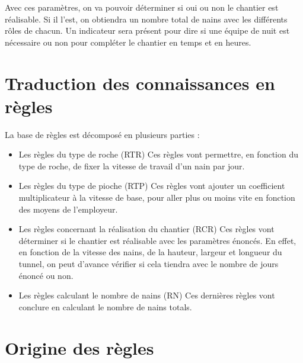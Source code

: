\documentclass[a4paper,10pt]{report}
\begin{document}
Avec ces paramètres, on va pouvoir déterminer si oui ou non le chantier est réalisable. Si il l’est, on obtiendra un nombre total de nains avec les différents rôles de chacun. Un indicateur sera présent pour dire si une équipe de nuit est nécessaire ou non pour compléter le chantier en temps et en heures.

\section{Traduction des connaissances en règles}

La base de règles est décomposé en plusieurs parties :
\begin{itemize}
\item Les règles du type de roche (RTR)
Ces règles vont permettre, en fonction du type de roche, de fixer la vitesse de travail d’un nain par jour.

\item Les règles du type de pioche (RTP)
Ces règles vont ajouter un coefficient multiplicateur à la vitesse de base, pour aller plus ou moins vite en fonction des moyens de l’employeur.

\item Les règles concernant la réalisation du chantier (RCR)
Ces règles vont déterminer si le chantier est réalisable avec les paramètres énoncés. En effet, en fonction de la vitesse des nains, de la hauteur, largeur et longueur du tunnel, on peut d’avance vérifier si cela tiendra avec le nombre de jours énoncé ou non.

\item Les règles calculant le nombre de nains (RN)
Ces dernières règles vont conclure en calculant le nombre de nains totals.
\end{itemize}

\section{Origine des règles}
\end{document}
